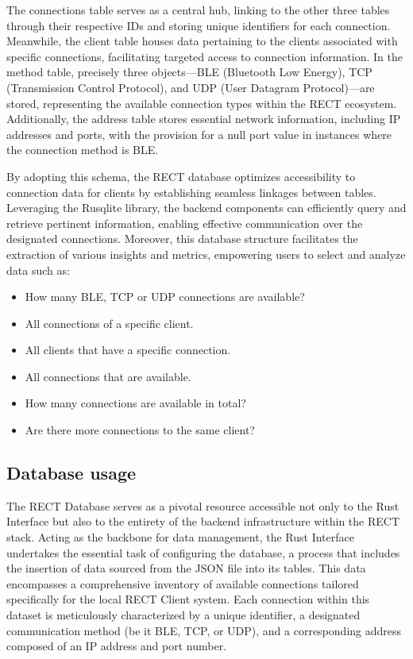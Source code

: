 The connections table serves as a central hub, linking to the other three tables through their respective IDs and storing unique identifiers for each connection. 
Meanwhile, the client table houses data pertaining to the clients associated with specific connections, facilitating targeted access to connection information. In the 
method table, precisely three objects—BLE (Bluetooth Low Energy), TCP (Transmission Control Protocol), and UDP (User Datagram Protocol)—are stored, representing the 
available connection types within the RECT ecosystem. Additionally, the address table stores essential network information, including IP addresses and ports, with the 
provision for a null port value in instances where the connection method is BLE.\newline

By adopting this schema, the RECT database optimizes accessibility to connection data for clients by establishing seamless linkages between tables. Leveraging the Rusqlite
library, the backend components can efficiently query and retrieve pertinent information, enabling effective communication over the designated connections. Moreover, this 
database structure facilitates the extraction of various insights and metrics, empowering users to select and analyze data such as:

\begin{itemize}
  \item[] How many BLE, TCP or UDP connections are available?
  \item[] All connections of a specific client.
  \item[] All clients that have a specific connection.
  \item[] All connections that are available.
  \item[] How many connections are available in total?
  \item[] Are there more connections to the same client?
\end{itemize}

\subsection{Database usage}

The RECT Database serves as a pivotal resource accessible not only to the Rust Interface but also to the entirety of the backend infrastructure within the RECT stack. 
Acting as the backbone for data management, the Rust Interface undertakes the essential task of configuring the database, a process that includes the insertion of data 
sourced from the JSON file into its tables. This data encompasses a comprehensive inventory of available connections tailored specifically for the local RECT Client system.
Each connection within this dataset is meticulously characterized by a unique identifier, a designated communication method (be it BLE, TCP, or UDP), and a corresponding 
address composed of an IP address and port number.\newline

